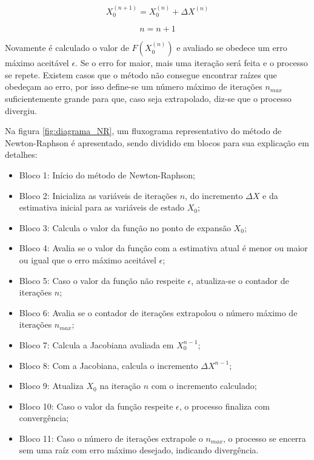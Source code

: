 \begin{equation}\label{eq:atualização_x_0}
    X_0^{(n+1)} = X_0^{(n)} + \Delta X^{(n)}
\end{equation}

\begin{equation}\label{eq:n=n+1}
    n = n+1
\end{equation}

Novamente é calculado o valor de $F(X_0^{(n)})$ e avaliado se obedece um erro máximo aceitável
$\epsilon$. Se o erro for maior, mais uma iteração será feita e o processo se repete. Existem casos que o método não consegue encontrar raízes que obedeçam ao erro, por isso define-se um número máximo de iterações $n_{max}$ suficientemente grande para que, caso seja extrapolado, diz-se que o processo divergiu.

Na figura \ref{fig:diagrama_NR}, um fluxograma representativo do método de Newton-Raphson é apresentado, sendo dividido em blocos para sua explicação em detalhes:

\begin{itemize}
    \item Bloco 1: Início do método de Newton-Raphson;
    \item Bloco 2: Inicializa as variáveis de iterações $n$, do incremento $\Delta X$ e da estimativa inicial para as variáveis de estado $X_0$;
    \item Bloco 3: Calcula o valor da função no ponto de expansão $X_0$;
    \item Bloco 4: Avalia se o valor da função com a estimativa atual é menor ou maior ou igual que o erro máximo aceitável $\epsilon$;
    \item Bloco 5: Caso o valor da função não respeite $\epsilon$, atualiza-se o contador de iterações $n$;
    \item Bloco 6: Avalia se o contador de iterações extrapolou o número máximo de iterações $n_{max}$;
    \item Bloco 7: Calcula a Jacobiana avaliada em $X_0^{n-1}$;
    \item Bloco 8: Com a Jacobiana, calcula o incremento $\Delta X^{n-1}$;
    \item Bloco 9: Atualiza $X_0$ na iteração $n$ com o incremento calculado;
    \item Bloco 10: Caso o valor da função respeite $\epsilon$, o processo finaliza com convergência;
    \item Bloco 11: Caso o número de iterações extrapole o $n_{max}$, o processo se encerra sem uma raíz com erro máximo desejado, indicando divergência.
\end{itemize}

